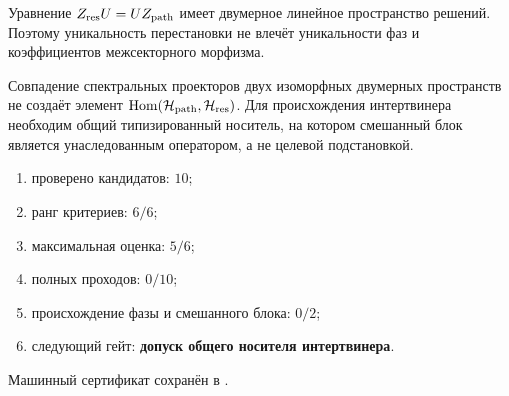 \begin{theorem}
Уравнение $Z_{\rm res}U=UZ_{\rm path}$ имеет двумерное линейное пространство
решений. Поэтому уникальность перестановки не влечёт уникальности фаз и
коэффициентов межсекторного морфизма.
\end{theorem}

\begin{nogocriterion}
Совпадение спектральных проекторов двух изоморфных двумерных пространств
не создаёт элемент $\operatorname{Hom}(\mathcal H_{\rm path},
\mathcal H_{\rm res})$. Для происхождения интертвинера необходим общий
типизированный носитель, на котором смешанный блок является унаследованным
оператором, а не целевой подстановкой.
\end{nogocriterion}

\begin{protocol}\begin{enumerate}
\item проверено кандидатов: \textbf{$10$};
\item ранг критериев: \textbf{$6/6$};
\item максимальная оценка: \textbf{$5/6$};
\item полных проходов: \textbf{$0/10$};
\item происхождение фазы и смешанного блока: \textbf{$0/2$};
\item следующий гейт: \textbf{допуск общего носителя интертвинера}.
\end{enumerate}\end{protocol}

Машинный сертификат сохранён в
.